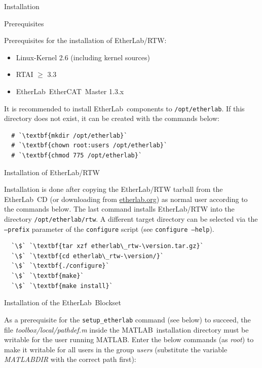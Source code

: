 \begin{ighsec}{Installation}
\label{sec:installation}

\begin{ighsec}{Prerequisites}

Prerequisites for the installation of EtherLab\regTM/RTW:

\begin{itemize}
\item Linux-Kernel 2.6 (including kernel sources)
\item RTAI $\ge$ 3.3
\item EtherLab\regTM\ EtherCAT\regTM\ Master 1.3.x
\end{itemize}

It is recommended to install EtherLab\regTM\ components to
\texttt{/opt/etherlab}. If this directory does not exist, it can be
created with the commands below:

\begin{lstlisting}
  # `\textbf{mkdir /opt/etherlab}`
  # `\textbf{chown root:users /opt/etherlab}`
  # `\textbf{chmod 775 /opt/etherlab}`
\end{lstlisting}

\end{ighsec}

\begin{ighsec}{Installation of EtherLab\regTM/RTW}
\label{sec:inst-paket}

Installation is done after copying the EtherLab\regTM/RTW tarball from
the EtherLab\regTM\ CD (or downloading from \url{etherlab.org}) as
normal user according to the commands below. The last command installs
EtherLab\regTM/RTW into the directory \texttt{/opt/etherlab/rtw}. A
different target directory can be selected via the \texttt{--prefix}
parameter of the \texttt{configure} script (see \texttt{configure
  --help}).

\begin{lstlisting}
  `\$` `\textbf{tar xzf etherlab\_rtw-\version.tar.gz}`
  `\$` `\textbf{cd etherlab\_rtw-\version/}`
  `\$` `\textbf{./configure}`
  `\$` `\textbf{make}`
  `\$` `\textbf{make install}`
\end{lstlisting}

\end{ighsec}

\begin{ighsec}{Installation of the EtherLab\regTM\ Blockset}
\label{sec:inst-blockset}

As a prerequisite for the \texttt{setup\_etherlab} command (see below)
to succeed, the file \textit{toolbox/local/pathdef.m} inside the
MATLAB\regTM\ installation directory must be writable for the user
running MATLAB\regTM. Enter the below commands (as \textit{root}) to
make it writable for all users in the group \textit{users} (substitute
the variable \textit{MATLABDIR} with the correct path first):


\end{ighsec}
\end{ighsec}
